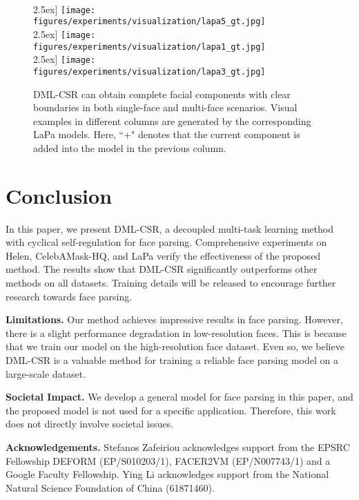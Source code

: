 \documentclass[10pt,twocolumn,letterpaper]{article}
\begin{document}
\begin{figure}
{\begin{minipage}[t]{0.14\linewidth}
   \\ \-2.5ex]
    \texttt{[image: figures/experiments/visualization/lapa5\_gt.jpg]}
   \\ \-2.5ex]
    \texttt{[image: figures/experiments/visualization/lapa1\_gt.jpg]}
   \\ \-2.5ex]
    \texttt{[image: figures/experiments/visualization/lapa3\_gt.jpg]}
    \end{minipage}
}
\vspace{-2.5mm}
\caption{DML-CSR can obtain complete facial components with clear boundaries in both single-face and multi-face scenarios. Visual examples in different columns are generated by the corresponding LaPa models. Here, ``+" denotes that the current component is added into the model in the previous column.}
\vspace{-6mm}
\label{fig:visualization}
\end{figure}
\section{Conclusion}

In this paper, we present DML-CSR, a decoupled multi-task learning method with cyclical self-regulation for face parsing. Comprehensive experiments on Helen, CelebAMask-HQ, and LaPa verify the effectiveness of the proposed method. The results show that DML-CSR significantly outperforms other methods on all datasets. Training details will be released to encourage further research towards face parsing.

\noindent\textbf{Limitations.} Our method achieves impressive results in face parsing. However, there is a slight performance degradation in low-resolution faces. This is because that we train our model on the high-resolution face dataset. Even so, we believe DML-CSR is a valuable method for training a reliable face parsing model on a large-scale dataset.

\noindent\textbf{Societal Impact.} We develop a general model for face parsing in this paper, and the proposed model is not used for a specific application. Therefore, this work does not directly involve societal issues.

\noindent\textbf{Acknowledgements.} Stefanos Zafeiriou acknowledges support from the EPSRC Fellowship DEFORM (EP/S010203/1), FACER2VM (EP/N007743/1) and a Google Faculty Fellowship. 
Ying Li acknowledges support from the National Natural Science Foundation of China (61871460).

{\small


}
\end{document}
